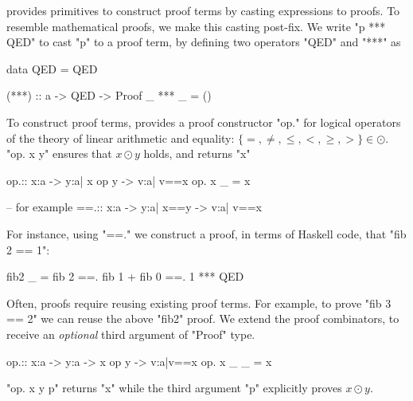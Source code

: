 \libname provides primitives to construct proof terms
by casting expressions to proofs.
%
To resemble mathematical proofs,
we make this casting post-fix.
%
We write "p *** QED" to cast "p" to a proof term,
by defining two operators "QED" and "***" as
%
\begin{code}
  data QED = QED

  (***) :: a -> QED -> Proof
  _ *** _  = ()
\end{code}

%
To construct proof terms, \libname
provides a proof constructor "op."
for logical operators of the theory of
linear arithmetic and equality:
$\{=, \not =, \leq, <, \geq, > \} \in \odot$.
"op. x y" ensures that $x \odot y$ holds, and returns "x"
%
\begin{code}
  op.:: x:a -> y:{a| x op y} -> {v:a| v==x}
  op. x _ = x

  -- for example
  ==.:: x:a -> y:{a| x==y} -> {v:a| v==x}
\end{code}
%
For instance, using "==."
we construct a proof, in terms of Haskell code,
that "fib 2 == 1":
%
\begin{code}
  fib2 _
    =   fib 2
    ==. fib 1 + fib 0
    ==. 1
    *** QED
\end{code} %

%
Often, proofs require reusing existing proof terms.
%
For example, to prove "fib 3 == 2" we can reuse the above
"fib2" proof.
%
We extend the proof combinators, to receive
an \textit{optional} third argument of "Proof" type.
%
\begin{code}
  op.:: x:a -> y:a -> {x op y} -> {v:a|v==x}
  op. x _ _ = x
\end{code}
%
"op. x y p" returns "x" while the third argument "p"
explicitly proves $x \odot y$.

